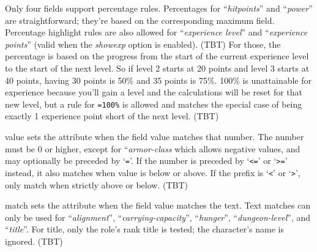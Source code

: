 Only four fields support percentage rules.
Percentages for ``{\it hitpoints\/}'' and ``{\it power\/}'' are
straightforward; they're based on the corresponding maximum field.
Percentage highlight rules are also allowed for ``{\it experience level\/}''
and ``{\it experience points\/}'' (valid when the
{\it showexp\/}
option is enabled).
(TBT)
For those, the percentage is based on the progress from the start of
the current experience level to the start of the next level.
So if level 2 starts at 20 points and level 3 starts at 40 points,
having 30 points is 50\% and 35 points is 75\%.
100\% is unattainable for experience because you'll gain a level and
the calculations will be reset for that new level, but a rule for
{\tt =100\%} is allowed and matches the special case of being
exactly 1 experience point short of the next level.
(TBT)
\item[{\tt absolute}] value sets the attribute when the field value
matches that number.
The number must be 0 or higher, except for ``{\it armor-class\/} which
allows negative values, and may optionally be preceded by `{\tt =}'.
If the number is preceded by `{\tt <=}' or `{\tt >=}' instead,
it also matches when value is below or above.
If the prefix is `{\tt <}' or `{\tt >}', only match when strictly
above or below.
(TBT)
\item[{\tt text}] match sets the attribute when the field value matches the text.
Text matches can only be used for ``{\it alignment\/}'',
``{\it carrying-capacity\/}'', ``{\it hunger\/}'', ``{\it dungeon-level\/}'',
and ``{\it title\/}''.
For title, only the role's rank title
is tested; the character's name is ignored.
(TBT)
\elist

